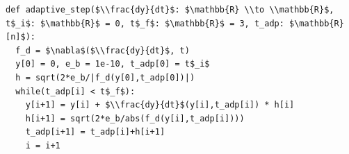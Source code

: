 \documentclass[border=10pt]{standalone}
\begin{document}
\begin{lstlisting}
def adaptive_step($\\frac{dy}{dt}$: $\mathbb{R} \\to \\mathbb{R}$, t$_i$: $\mathbb{R}$ = 0, t$_f$: $\mathbb{R}$ = 3, t_adp: $\mathbb{R}[n]$):
  f_d = $\nabla$($\\frac{dy}{dt}$, t)
  y[0] = 0, e_b = 1e-10, t_adp[0] = t$_i$
  h = sqrt(2*e_b/|f_d(y[0],t_adp[0])|)
  while(t_adp[i] < t$_f$):
    y[i+1] = y[i] + $\\frac{dy}{dt}$(y[i],t_adp[i]) * h[i]
    h[i+1] = sqrt(2*e_b/abs(f_d(y[i],t_adp[i])))
    t_adp[i+1] = t_adp[i]+h[i+1]
    i = i+1
\end{lstlisting}
\end{document}
